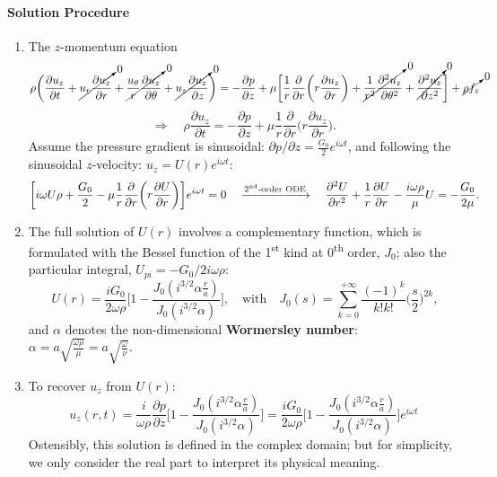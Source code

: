 \documentclass[a4paper]{article}
\begin{document}
\paragraph{Solution Procedure}
\begin{enumerate}[label=\underline{\textbf{Step \arabic*}}]
    \item The $z$-momentum equation
    \[
        \rho \bigg(\frac{\partial u_{z}}{\partial t} + \cancelto{0}{u_{r} \frac{\partial u_{z}}{\partial r}} + \cancelto{0}{\frac{u_{\theta}}{r}\frac{\partial u_{z}}{\partial \theta}} + \cancelto{0}{u_{z}\frac{\partial u_{z}}{\partial z}} \bigg) = -\frac{\partial p}{\partial z} + \mu \bigg[ \frac{1}{r}\frac{\partial}{\partial r} \bigg(r \frac{\partial u_{z}}{\partial r}\bigg) + \cancelto{0}{\frac{1}{r^{2}} \frac{\partial^{2} u_{z}}{\partial \theta^{2}}} + \cancelto{0}{\frac{\partial^{2} u_{z}}{\partial z^{2}}} \bigg] + \cancelto{0}{\rho f_{z}}
    \]
    \[
        \Rightarrow \quad \rho \frac{\partial u_z}{\partial t} = -\frac{\partial p}{\partial z} + \mu \frac{1}{r} \frac{\partial}{\partial r} \bigg(r\frac{\partial u_z}{\partial r} \bigg).
    \]
    Assume the pressure gradient is sinusoidal: $\displaystyle \partial p / \partial z = \frac{G_0}{2}e^{i\omega t}$, and following the sinusoidal $z$-velocity: $u_z = U(r) e^{i\omega t}$:
    \[
        \bigg[ i\omega U \rho + \frac{G_0}{2} - \mu \frac{1}{r}\frac{\partial}{\partial r} \bigg(r\frac{\partial U}{\partial r}\bigg) \bigg] e^{i\omega t} = 0
        \quad \xrightarrow[]{\text{2\textsuperscript{nd}-order ODE}} \quad
        \frac{\partial^2 U}{\partial r^2} + \frac{1}{r} \frac{\partial U}{\partial r} - \frac{i\omega \rho}{\mu} U = - \frac{G_0}{2\mu}.
    \]

    \item The full solution of $U(r)$ involves a complementary function, which is formulated with the Bessel function of the 1\textsuperscript{st} kind at 0\textsuperscript{th} order, $J_0$; also the particular integral, $U_{pi} = -G_0 / 2i\omega \rho$:
    \[\
        U(r) = \frac{iG_{0}}{2\omega \rho}\bigg[ 1- \frac{J_{0}(i^{3/2}\alpha \frac{r}{a})}{J_{0}(i^{3/2}\alpha)} \bigg],
        \quad \text{with} \quad 
        J_0(s) = \sum_{k=0}^{+\infty} \frac{(-1)^k}{k!k!}\bigg(\frac{s}{2}\bigg)^{2k},
    \]
    and $\alpha$ denotes the non-dimensional \textbf{Wormersley number}: $\displaystyle \alpha = a \sqrt{\frac{\omega \rho}{\mu}} = a \sqrt{\frac{\omega}{\nu}}$.
    
    \item To recover $u_z$ from $U(r)$:
    \[
        u_{z}(r,t) 
        = \frac{i}{\omega \rho} \frac{\partial p}{\partial z} \bigg[ 1- \frac{J_{0}(i^{3/2}\alpha \frac{r}{a})}{J_{0}(i^{3/2}\alpha)} \bigg] 
        = \frac{iG_{0}}{2\omega \rho}\bigg[ 1- \frac{J_{0}(i^{3/2}\alpha \frac{r}{a})}{J_{0}(i^{3/2}\alpha)} \bigg] e^{i\omega t}
    \]
    Ostensibly, this solution is defined in the complex domain; but for simplicity, we only consider the real part to interpret its physical meaning.
\end{enumerate}
\end{document}
